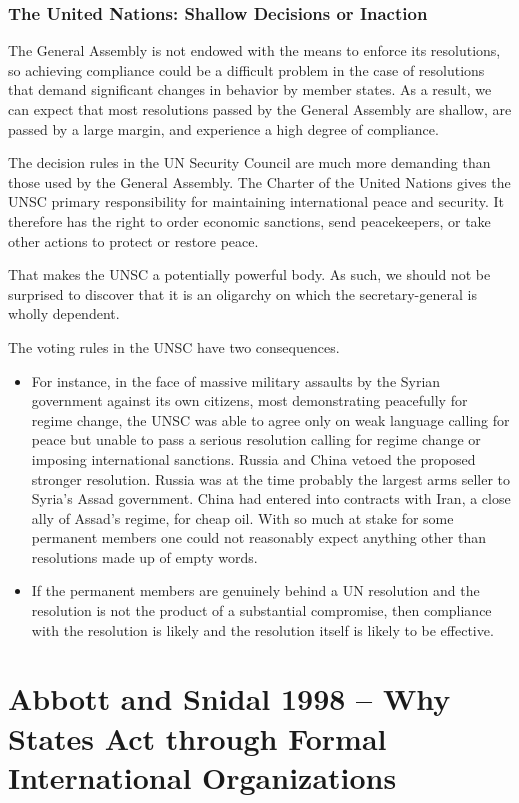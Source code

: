 \subsubsection{The United Nations: Shallow Decisions or Inaction}
The General Assembly is not endowed with the means to enforce its resolutions, so achieving compliance could be a difficult problem in the case of resolutions that demand significant changes in behavior by member states. As a result, we can expect that most resolutions passed by the General Assembly are shallow, are passed by a large margin, and experience a high degree of compliance.

The decision rules in the UN Security Council are much more demanding than those used by the General Assembly. The Charter of the United Nations gives the UNSC primary responsibility for maintaining international peace and security. It therefore has the right to order economic sanctions, send peacekeepers, or take other actions to protect or restore peace.

That makes the UNSC a potentially powerful body. As such, we should not be surprised to discover that it is an oligarchy on which the secretary-general is wholly dependent.

The voting rules in the UNSC have two consequences.
\begin{itemize}
    \item For instance, in the face of massive military assaults by the Syrian government against its own citizens, most demonstrating peacefully for regime change, the UNSC was able to agree only on weak language calling for peace but unable to pass a serious resolution calling for regime change or imposing international sanctions.
    Russia and China vetoed the proposed stronger resolution. Russia was at the time probably the largest arms seller to Syria’s Assad government. China had entered into contracts with Iran, a close ally of Assad’s regime, for cheap oil. With so much at stake for some permanent members one could not reasonably expect anything other than resolutions made up of empty words.

    \item If the permanent members are genuinely behind a UN resolution and the resolution is not the product of a substantial compromise, then compliance with the resolution is likely and the resolution itself is likely to be effective.
\end{itemize}

\clearpage
\section{Abbott and Snidal 1998 -- Why States Act through Formal International Organizations}

